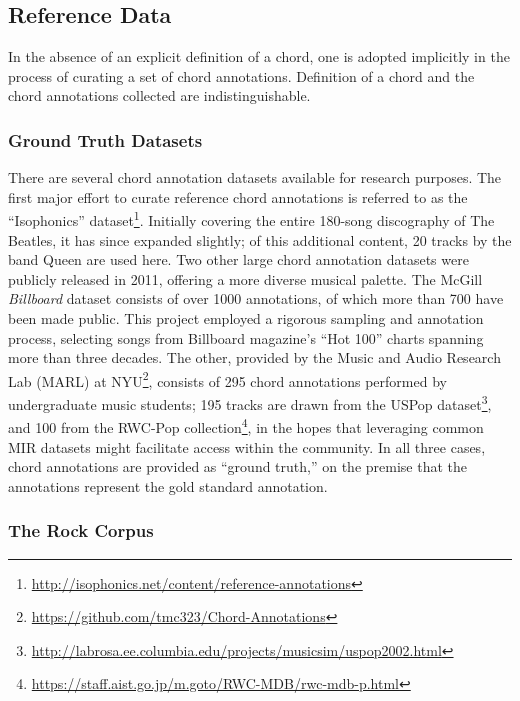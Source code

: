 \documentclass{article}
\begin{document}
\subsection{Reference Data}
\label{subsec:data}

In the absence of an explicit definition of a chord, one is adopted implicitly in the process of curating a set of chord annotations.
Definition of a chord and the chord annotations collected are indistinguishable.

\subsubsection{Ground Truth Datasets}

There are several chord annotation datasets available for research purposes.
The first major effort to curate reference chord annotations is referred to as the ``Isophonics'' dataset\footnote{\url{http://isophonics.net/content/reference-annotations}}.
Initially covering the entire 180-song discography of The Beatles, it has since expanded slightly;
of this additional content, 20 tracks by the band Queen are used here.
Two other large chord annotation datasets were publicly released in 2011, offering a more diverse musical palette.
The McGill \emph{Billboard} dataset consists of over 1000 annotations, of which more than 700 have been made public.
This project employed a rigorous sampling and annotation process, selecting songs from Billboard magazine's ``Hot 100'' charts spanning more than three decades.
The other, provided by the Music and Audio Research Lab (MARL) at NYU\footnote{\url{https://github.com/tmc323/Chord-Annotations}}, consists of 295 chord annotations performed by undergraduate music students;
195 tracks are drawn from the USPop dataset\footnote{\url{http://labrosa.ee.columbia.edu/projects/musicsim/uspop2002.html}}, and 100 from the RWC-Pop collection\footnote{\url{https://staff.aist.go.jp/m.goto/RWC-MDB/rwc-mdb-p.html}}, in the hopes that leveraging common MIR datasets might facilitate access within the community.
In all three cases, chord annotations are provided as ``ground truth,'' on the premise that the annotations represent the gold standard annotation.


\subsubsection{The Rock Corpus}
\end{document}
